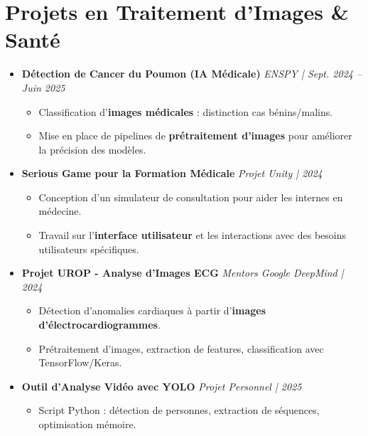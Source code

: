\documentclass[a4paper,11pt]{article}
\begin{document}
\section{Projets en Traitement d'Images \& Santé}
\begin{itemize}[leftmargin=*, label={-}]

\item \textbf{Détection de Cancer du Poumon (IA Médicale)} \hfill \textit{ENSPY | Sept. 2024 -- Juin 2025}
\vspace{-2pt}
\begin{itemize}[leftmargin=0.4cm, nosep, label=\tiny$\bullet$]
    \item \small{Classification d'\textbf{images médicales} : distinction cas bénins/malins.}
    \item \small{Mise en place de pipelines de \textbf{prétraitement d'images} pour améliorer la précision des modèles.}
\end{itemize}
\vspace{3pt}

\item \textbf{Serious Game pour la Formation Médicale} \hfill \textit{Projet Unity | 2024}
\vspace{-2pt}
\begin{itemize}[leftmargin=0.4cm, nosep, label=\tiny$\bullet$]
    \item \small{Conception d'un simulateur de consultation pour aider les internes en médecine.}
    \item \small{Travail sur l'\textbf{interface utilisateur} et les interactions avec des besoins utilisateurs spécifiques.}
\end{itemize}
\vspace{3pt}

\item \textbf{Projet UROP - Analyse d'Images ECG} \hfill \textit{Mentors Google DeepMind | 2024}
\vspace{-2pt}
\begin{itemize}[leftmargin=0.4cm, nosep, label=\tiny$\bullet$]
    \item \small{Détection d'anomalies cardiaques à partir d'\textbf{images d'électrocardiogrammes}.}
    \item \small{Prétraitement d'images, extraction de features, classification avec TensorFlow/Keras.}
\end{itemize}
\vspace{3pt}

\item \textbf{Outil d'Analyse Vidéo avec YOLO} \hfill \textit{Projet Personnel | 2025}
\vspace{-2pt}
\begin{itemize}[leftmargin=0.4cm, nosep, label=\tiny$\bullet$]
    \item \small{Script Python : détection de personnes, extraction de séquences, optimisation mémoire.}
\end{itemize}

\end{itemize}
\end{document}
